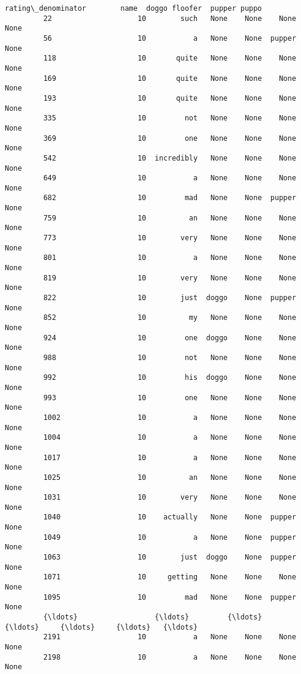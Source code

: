 \documentclass[11pt]{article}
\begin{document}
\begin{Verbatim}[commandchars=\\\{\}]
               rating\_denominator        name  doggo floofer  pupper puppo  
         22                    10        such   None    None    None  None  
         56                    10           a   None    None  pupper  None  
         118                   10       quite   None    None    None  None  
         169                   10       quite   None    None    None  None  
         193                   10       quite   None    None    None  None  
         335                   10         not   None    None    None  None  
         369                   10         one   None    None    None  None  
         542                   10  incredibly   None    None    None  None  
         649                   10           a   None    None    None  None  
         682                   10         mad   None    None  pupper  None  
         759                   10          an   None    None    None  None  
         773                   10        very   None    None    None  None  
         801                   10           a   None    None    None  None  
         819                   10        very   None    None    None  None  
         822                   10        just  doggo    None  pupper  None  
         852                   10          my   None    None    None  None  
         924                   10         one  doggo    None    None  None  
         988                   10         not   None    None    None  None  
         992                   10         his  doggo    None    None  None  
         993                   10         one   None    None    None  None  
         1002                  10           a   None    None    None  None  
         1004                  10           a   None    None    None  None  
         1017                  10           a   None    None    None  None  
         1025                  10          an   None    None    None  None  
         1031                  10        very   None    None    None  None  
         1040                  10    actually   None    None  pupper  None  
         1049                  10           a   None    None  pupper  None  
         1063                  10        just  doggo    None  pupper  None  
         1071                  10     getting   None    None    None  None  
         1095                  10         mad   None    None  pupper  None  
         {\ldots}                  {\ldots}         {\ldots}    {\ldots}     {\ldots}     {\ldots}   {\ldots}  
         2191                  10           a   None    None    None  None  
         2198                  10           a   None    None    None  None  

\end{Verbatim}
\end{document}
